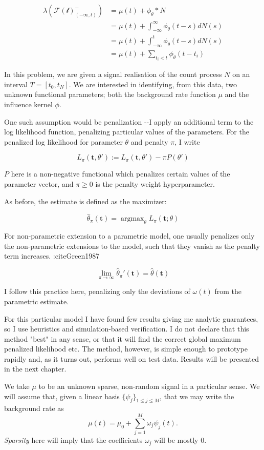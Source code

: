 \documentclass[11pt]{article}
\def\lt{<}
\begin{document}
\[
\begin{aligned}
\lambda(\mathcal{F(t)}^-_{(-\infty,t)}) &= \mu(t) + \phi_\theta * N\\
&= \mu(t)  + \int_{-\infty}^{\infty}\phi_\theta(t-s)dN(s)\\
&= \mu(t) + \int_{-\infty}^{t}\phi_\theta(t-s)dN(s)\\
&= \mu(t) + \sum_{t_i\lt t}\phi_\theta(t-t_i)
\end{aligned}
\]

In this problem, we are given a signal realisation of the count process
$N$ on an interval $T=[t_0,t_N]$. We are interested in identifying, from
this data, two unknown functional parameters; both the background rate
function $\mu$ and the influence kernel $\phi$.

    One such assumption would be penalization -{}-I apply an additional term
to the log likelihood function, penalizing particular values of the
parameters. For the penalized log likelihood for parameter $\theta$ and
penalty $\pi$, I write

\[L_\pi(\mathbf t, \theta'):= L_\pi(\mathbf t, \theta')- \pi P(\theta')\]

$P$ here is a non-negative functional which penalizes certain values of
the parameter vector, and $\pi\geq 0$ is the penalty weight
hyperparameter.

As before, the estimate is defined as the maximizer:

\[\hat{\theta}_\pi(\mathbf t) = \operatorname{argmax}_\theta L_\pi(\mathbf t;\theta)\]

For non-parametric extension to a parametric model, one usually
penalizes only the non-parametric extensions to the model, such that
they vanish as the penalty term increases. :citeGreen1987

\[\lim_{\pi\to\infty}\hat{\theta}_\pi'(\mathbf t) =\hat{\theta}(\mathbf t)\]

I follow this practice here, penalizing only the deviations of
$\omega(t)$ from the parametric estimate.

For this particular model I have found few results giving me analytic
guarantees, so I use heuristics and simulation-based verification. I do
not declare that this method "best" in any sense, or that it will find
the correct global maximum penalized likelihood etc. The method,
however, is simple enough to prototype rapidly and, as it turns out,
performs well on test data. Results will be presented in the next
chapter.

    We take $\mu$ to be an unknown sparse, non-random signal in a particular
sense. We will assume that, given a linear basis
$\{\psi_j \}_{1\leq j\leq M}$, that we may write the background rate as
\[\mu(t) = \mu_0 + \sum_{j=1}^M  \omega_j \psi_j(t).\] \emph{Sparsity}
here will imply that the coefficients $\omega_j$ will be mostly 0.
\end{document}
